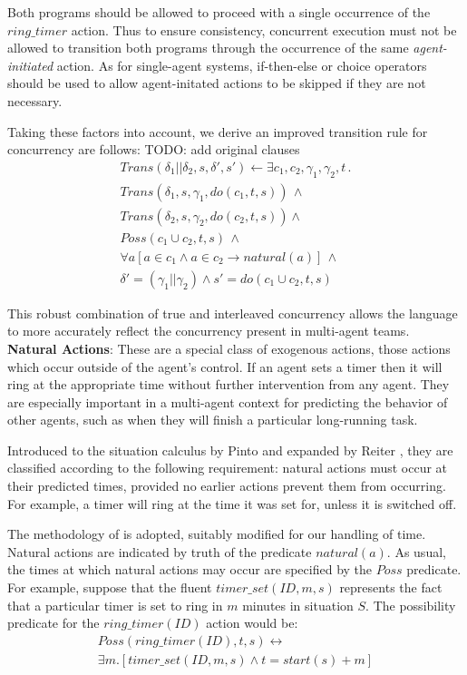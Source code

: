 \documentclass[letterpaper]{article}
\begin{document}
Both programs should be allowed to proceed with a single occurrence
of the $ring\_ timer$ action. Thus to ensure consistency, 
concurrent execution must not be allowed
to transition both programs through the occurrence of the same
\emph{agent-initiated} action.  As for single-agent systems, if-then-else or
choice operators should be used to allow agent-initated actions to be
skipped if they are not necessary.

Taking these factors into account, we derive an improved transition
rule for concurrency are follows:
TODO: add original clauses
\begin{multline}
\label{eqn:trans_conc_new}
Trans(\delta_{1}||\delta_{2},s,\delta',s')\leftarrow \exists c_{1},c_{2},\gamma_{1},\gamma_{2},t\,.\\
Trans(\delta_{1},s,\gamma_{1},do(c_{1},t,s))\,\wedge\\
Trans(\delta_{2},s,\gamma_{2},do(c_{2},t,s))\wedge\\
Poss(c_{1}\cup c_{2},t,s)\,\wedge\\
\forall a\left[a\in c_{1}\wedge a\in c_{2}\rightarrow natural(a)\right]\,\wedge\\
\delta'=(\gamma_{1}||\gamma_{2})\wedge s'=do(c_{1}\cup c_{2},t,s)
\end{multline}

This robust combination of true and interleaved concurrency allows
the language to more accurately reflect the concurrency present in
multi-agent teams.
\\

\textbf{Natural Actions}: These are a special class of exogenous actions, those
actions which occur
outside of the agent's control.
If an agent sets a timer then it will
ring at the appropriate time without further intervention from any agent.  They
are especially important in a multi-agent context for predicting the
behavior of other agents, such as when they will finish a particular
long-running task.

Introduced to the situation
calculus by Pinto \cite{pinto94temporal} and expanded by Reiter \cite{reiter96sc_nat_conc},
they are classified according to the following requirement: natural
actions must occur at their predicted times, provided no earlier actions
prevent them from occurring. For example, a timer will ring at the
time it was set for, unless it is switched off.

The methodology of \cite{reiter96sc_nat_conc} is adopted, suitably
modified for our handling of time. Natural actions are indicated by
truth of the predicate $natural(a)$. As usual, the times at which
natural actions may occur are specified by the $Poss$ predicate.
For example, suppose that the fluent $timer\_set(ID,m,s)$ represents
the fact that a particular timer is set to ring in $m$ minutes in
situation $S$. The possibility predicate for the $ring\_timer(ID)$
action would be:
\begin{multline}
Poss(ring\_timer(ID),t,s)\leftrightarrow\\
\exists m.\left[timer\_set(ID,m,s)\wedge t=start(s)+m\right]
\end{multline}
\end{document}
